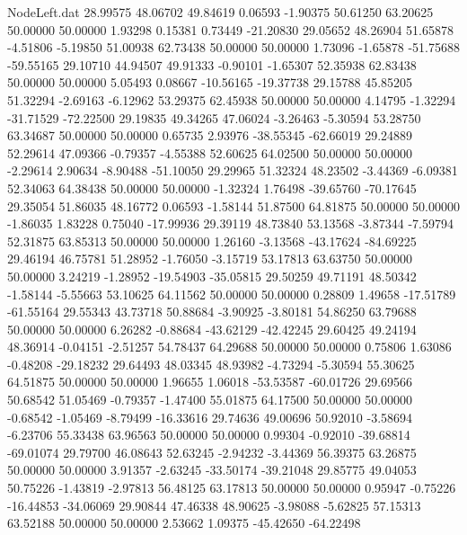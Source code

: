 \begin{filecontents}{NodeLeft.dat}
  28.99575   48.06702   49.84619     0.06593   -1.90375   50.61250   63.20625   50.00000   50.00000    1.93298    0.15381    0.73449  -21.20830
  29.05652   48.26904   51.65878    -4.51806   -5.19850   51.00938   62.73438   50.00000   50.00000    1.73096   -1.65878  -51.75688  -59.55165
  29.10710   44.94507   49.91333    -0.90101   -1.65307   52.35938   62.83438   50.00000   50.00000    5.05493    0.08667  -10.56165  -19.37738
  29.15788   45.85205   51.32294    -2.69163   -6.12962   53.29375   62.45938   50.00000   50.00000    4.14795   -1.32294  -31.71529  -72.22500
  29.19835   49.34265   47.06024    -3.26463   -5.30594   53.28750   63.34687   50.00000   50.00000    0.65735    2.93976  -38.55345  -62.66019
  29.24889   52.29614   47.09366    -0.79357   -4.55388   52.60625   64.02500   50.00000   50.00000   -2.29614    2.90634   -8.90488  -51.10050
  29.29965   51.32324   48.23502    -3.44369   -6.09381   52.34063   64.38438   50.00000   50.00000   -1.32324    1.76498  -39.65760  -70.17645
  29.35054   51.86035   48.16772     0.06593   -1.58144   51.87500   64.81875   50.00000   50.00000   -1.86035    1.83228    0.75040  -17.99936
  29.39119   48.73840   53.13568    -3.87344   -7.59794   52.31875   63.85313   50.00000   50.00000    1.26160   -3.13568  -43.17624  -84.69225
  29.46194   46.75781   51.28952    -1.76050   -3.15719   53.17813   63.63750   50.00000   50.00000    3.24219   -1.28952  -19.54903  -35.05815
  29.50259   49.71191   48.50342    -1.58144   -5.55663   53.10625   64.11562   50.00000   50.00000    0.28809    1.49658  -17.51789  -61.55164
  29.55343   43.73718   50.88684    -3.90925   -3.80181   54.86250   63.79688   50.00000   50.00000    6.26282   -0.88684  -43.62129  -42.42245
  29.60425   49.24194   48.36914    -0.04151   -2.51257   54.78437   64.29688   50.00000   50.00000    0.75806    1.63086   -0.48208  -29.18232
  29.64493   48.03345   48.93982    -4.73294   -5.30594   55.30625   64.51875   50.00000   50.00000    1.96655    1.06018  -53.53587  -60.01726
  29.69566   50.68542   51.05469    -0.79357   -1.47400   55.01875   64.17500   50.00000   50.00000   -0.68542   -1.05469   -8.79499  -16.33616
  29.74636   49.00696   50.92010    -3.58694   -6.23706   55.33438   63.96563   50.00000   50.00000    0.99304   -0.92010  -39.68814  -69.01074
  29.79700   46.08643   52.63245    -2.94232   -3.44369   56.39375   63.26875   50.00000   50.00000    3.91357   -2.63245  -33.50174  -39.21048
  29.85775   49.04053   50.75226    -1.43819   -2.97813   56.48125   63.17813   50.00000   50.00000    0.95947   -0.75226  -16.44853  -34.06069
  29.90844   47.46338   48.90625    -3.98088   -5.62825   57.15313   63.52188   50.00000   50.00000    2.53662    1.09375  -45.42650  -64.22498

\end{filecontents}
